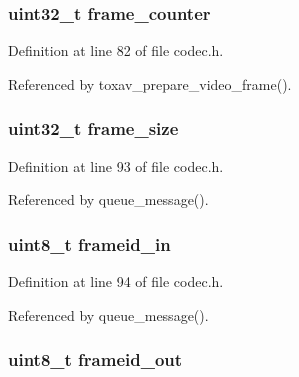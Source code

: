 \hypertarget{struct___c_s_session_abeaee952422869c026bab7d7f3f0f145}{
\subsubsection[{frame\+\_\+counter}]{\setlength{\rightskip}{0pt plus 5cm}uint32\+\_\+t frame\+\_\+counter}}\label{struct___c_s_session_abeaee952422869c026bab7d7f3f0f145}


Definition at line 82 of file codec.\+h.



Referenced by toxav\+\_\+prepare\+\_\+video\+\_\+frame().

\hypertarget{struct___c_s_session_a0229abcfe4414f86dcf52c5ebf84311c}{
\subsubsection[{frame\+\_\+size}]{\setlength{\rightskip}{0pt plus 5cm}uint32\+\_\+t frame\+\_\+size}}\label{struct___c_s_session_a0229abcfe4414f86dcf52c5ebf84311c}


Definition at line 93 of file codec.\+h.



Referenced by queue\+\_\+message().

\hypertarget{struct___c_s_session_affc5ab5608c4d2dea8513fdc2b2cd6e6}{
\subsubsection[{frameid\+\_\+in}]{\setlength{\rightskip}{0pt plus 5cm}uint8\+\_\+t frameid\+\_\+in}}\label{struct___c_s_session_affc5ab5608c4d2dea8513fdc2b2cd6e6}


Definition at line 94 of file codec.\+h.



Referenced by queue\+\_\+message().

\hypertarget{struct___c_s_session_acea7b9bf7e58ed8e24980edeaacecc25}{
\subsubsection[{frameid\+\_\+out}]{\setlength{\rightskip}{0pt plus 5cm}uint8\+\_\+t frameid\+\_\+out}}\label{struct___c_s_session_acea7b9bf7e58ed8e24980edeaacecc25}


